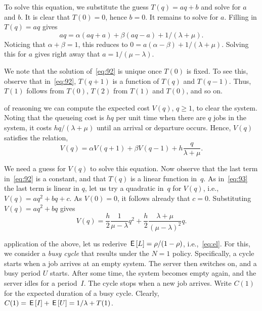 To solve this equation, we substitute the guess $T(q) = aq+b$ and solve for $a$ and $b$.
It is clear that $T(0)=0$, hence $b=0$.
It remains to solve for $a$. Filling in $T(q)=aq$ gives
\begin{equation*}
  a q = \alpha (aq + a) + \beta (a q - a) + 1/(\lambda+\mu). 
\end{equation*}
Noticing that $\alpha + \beta = 1$, this reduces to $0 = a(\alpha - \beta) + 1/(\lambda + \mu)$. Solving this for $a$ gives right away that $a = 1/(\mu-\lambda)$. 

We note that the solution of~\cref{eq:92} is unique once $T(0)$ is fixed. To see this, observe that in~\cref{eq:92}, $T(q+1)$ is a function of $T(q)$ and $T(q-1)$. Thus, $T(1)$ follows from $T(0)$, $T(2)$ from $T(1)$ and $T(0)$, and so on. 


 of reasoning we can compute the expected cost $V(q)$, $q\geq 1$, to clear the system.
Noting that the queueing cost is $hq$ per unit time when there are $q$ jobs in the system, it costs $hq/(\lambda+\mu)$ until an arrival or departure occurs. 
Hence, $V(q)$ satisfies the relation,
\begin{equation}\label{eq:93}
  V(q) = \alpha V(q+1) + \beta V(q-1) + h\frac{q}{\lambda + \mu}.
\end{equation}


We need a guess for $V(q)$ to solve this equation.
Now observe that the last term in~\cref{eq:92} is a constant, and that $T(q)$ is a linear function in~$q$.
As in~\cref{eq:93} the last term is linear in $q$,  let us try a quadratic in~$q$ for $V(q)$, i.e., $V(q)=a q^2 + b q + c$.
As $V(0)=0$, it follows already that $c=0$.
Substituting $V(q) = aq^2 + b q$ gives
\begin{equation*}
  V(q) = \frac h 2 \frac 1 {\mu -\lambda} q^2 + \frac h 2 \frac{\lambda + \mu}{(\mu - \lambda)^2}q.
\end{equation*}


 application of the above, let us rederive $\,\mathsf{E}\left[L\right] = \rho/(1-\rho)$, i.e.,~\cref{eq:el}.
For this, we consider a \emph{busy cycle} that results under the $N=1$ policy.
Specifically, a cycle starts when a job arrives at an empty system.
The server then switches on, and a busy period $U$ starts.
After some time,
the system becomes empty again, and the server idles for a period~$I$.
The cycle stops when a new job arrives.
Write $C(1)$ for the expected duration of a busy cycle.
Clearly, $C(1)=\,\mathsf{E}\left[I\right] + \,\mathsf{E}\left[U\right] = 1/\lambda + T(1)$.

